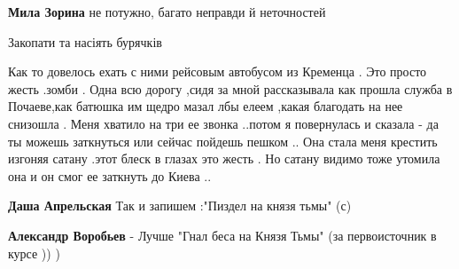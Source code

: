 \begin{itemize}
\begin{itemize}
\textbf{Мила Зорина} не потужно, багато неправди й неточностей
\end{itemize}

 
Закопати та насіять бурячків 🌵

 
Как то довелось ехать с ними рейсовым автобусом из Кременца .
Это просто жесть .зомби .
Одна всю дорогу ,сидя за мной рассказывала как прошла служба в Почаеве,как батюшка им щедро мазал лбы елеем ,какая благодать на нее снизошла .
Меня хватило на три ее звонка ..потом я повернулась и сказала - да ты можешь заткнуться или сейчас пойдешь пешком ..
Она стала меня крестить изгоняя сатану .этот блеск в глазах это жесть .
Но сатану видимо тоже утомила она и он смог ее заткнуть до Киева ..

\begin{itemize}
 
\textbf{Даша Апрельская}
Так и запишем :"Пиздел на князя тьмы" (с)

 
\textbf{Александр Воробьев} - Лучше "Гнал беса на Князя Тьмы"
(за первоисточник в курсе )) )
\end{itemize}

 

\end{itemize}
